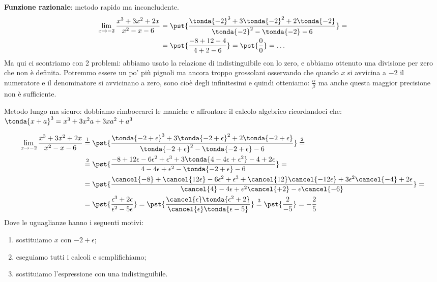 \begin{esempio}
\textbf{Funzione razionale}: metodo rapido ma inconcludente.
\begin{align*}
\lim_{x \rightarrow -2} \frac{x^3+3x^2+2x}{x^2-x-6} & = 
\pst{\frac
  {\tonda{-2}^3+3\tonda{-2}^2+2\tonda{-2}}
  {\tonda{-2}^2-\tonda{-2}-6}} =\\ 
  &=\pst{\frac{-8+12-4}
              {4+2-6}} = \pst{\frac{0}{0}} = \dots
\end{align*}
Ma qui ci scontriamo con 2 problemi: abbiamo usato la relazione di 
indistinguibile con lo zero, e abbiamo ottenuto una divisione per zero che 
non è definita. Potremmo essere un po' più pignoli ma ancora troppo 
grossolani osservando che quando \(x\) si avvicina a \(-2\) il numeratore e 
il denominatore si avvicinano a zero, sono cioè degli infinitesimi e quindi 
otteniamo: \(\frac{\alpha}{\beta}\) ma anche questa maggior precisione non 
è sufficiente.

Metodo lungo ma sicuro:
dobbiamo rimboccarci le maniche e affrontare il calcolo algebrico 
ricordandoci che: \\
\(\tonda{x+a}^3= x^3+3x^2a+3xa^2+a^3\)

\begin{align*}
\lim_{x \rightarrow -2} \frac{x^3+3x^2+2x}{x^2-x-6} & \stackrel{1}{=} 
\pst{\frac
  {\tonda{-2+\epsilon}^3+3\tonda{-2+\epsilon}^2+2\tonda{-2+\epsilon}}
  {\tonda{-2+\epsilon}^2-\tonda{-2+\epsilon}-6}} \stackrel{2}{=}\\ 
  &\stackrel{2}{=}\pst{\frac{-8+12\epsilon-6\epsilon^2+\epsilon^3+
             3\tonda{4-4\epsilon+\epsilon^2}-4+2\epsilon}
             {4-4\epsilon+\epsilon^2-\tonda{-2+\epsilon}-6}} =\\ 
  &=\pst{\frac{\cancel{-8}+\cancel{12\epsilon}-6\epsilon^2+\epsilon^3+
          \cancel{12}\cancel{-12\epsilon}+3\epsilon^2\cancel{-4}+2\epsilon}
             {\cancel{4}-4\epsilon+
              \epsilon^2\cancel{+2}-\epsilon\cancel{-6}}}=\\ 
  &=\pst{\frac{\epsilon^3+2\epsilon}{\epsilon^2-5\epsilon}} = 
    \pst{\frac{\cancel{\epsilon} \tonda{\epsilon^2+2}}
             {\cancel{\epsilon} \tonda{\epsilon-5}}}  \stackrel{3}{=} 
    \pst{\frac{2}{-5}} = -\frac{2}{5}
\end{align*}
Dove le uguaglianze hanno i seguenti motivi:
\begin{enumerate} [nosep]
 \item sostituiamo \(x\) con \(-2+\epsilon\);
 \item eseguiamo tutti i calcoli e semplifichiamo;
 \item sostituiamo l'espressione con una indistinguibile.
\end{enumerate}
\end{esempio}

